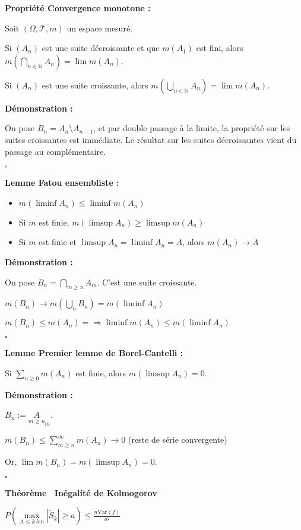 \documentclass[10pt,a4paper,notitlepage ]{report}
\newcommand{\N}{\mathbb N}
\newcommand{\T}{\mathcal T}
\newcommand{\1}{\mathds 1}
\newcommand{\var}{\mathrm{Var}}
\newcounter{th}
\newenvironment{theorem}[1][]{
\refstepcounter{th}
\begin{tcolorbox}
	\textbf{Théorème \theth \ #1}
	
	
}{\end{tcolorbox}}
\newenvironment{propriete}[1][]{
	\begin{tcolorbox}
		\textbf{Propriété #1 : }
}
{\end{tcolorbox}}
\newenvironment{demo}[1][]{

	\textbf{Démonstration #1 :}
}{\begin{flushright}
	$\square$
\end{flushright}
}
\newenvironment{lemme}[1][]{
	\begin{tcolorbox}
		\textbf{Lemme #1 : }
	}
	{\end{tcolorbox}}
\begin{document}
\begin{propriete}[Convergence monotone]
	Soit $(\Omega, \T, m)$ un espace mesuré.
	
	Si $(A_n)$ est une suite décroissante et que $m(A_1)$ est fini, alors $m(\underset {n\in\N} \bigcap A_n) = \lim m(A_n)$.
	
	Si $(A_n)$ est une suite croissante, alors $m(\underset {n\in\N} \bigcup A_n) = \lim m(A_n)$.
\end{propriete}

\begin{demo}
	On pose $B_n = A_n \setminus A_{n-1}$, et par double passage à la limite, la propriété sur les suites croissantes est immédiate. Le résultat sur les suites décroissantes vient du passage au complémentaire.
\end{demo}

\begin{lemme}[Fatou ensembliste]
	\begin{itemize}
		\item $m(\liminf A_n) \le \liminf m(A_n)$
		\item Si $m$ est finie, $m(\limsup A_n) \ge \limsup m(A_n)$
		\item Si $m$ est finie et $\limsup A_n = \liminf A_n = A$, alors $m(A_n) \rightarrow A$
	\end{itemize}
\end{lemme}

\begin{demo}
	On pose $B_n = \underset {m \ge n} \bigcap A_m$. C'est une suite croissante.
	
	$m(B_n) \rightarrow m(\underset n \bigcup B_n) = m(\liminf A_n)$
	
	$m(B_n) \le m(A_n)= \Rightarrow \liminf m(A_n) \le m(\liminf A_n)$
\end{demo}

\begin{lemme}[Premier lemme de Borel-Cantelli]
	Si $\underset {n\ge 0} \sum m(A_n)$ est finie, alors $m(\limsup A_n) = 0$.
\end{lemme}

\begin{demo}
	$B_n := \underset {m\ge n} A_m$.
	
	$m(B_n) \le \sum_{m \ge n}^\infty m(A_n) \rightarrow 0$ (reste de série convergente)
	
	Or, $\lim m(B_n) = m(\limsup A_n) = 0$.
\end{demo}

\begin{theorem}[Inégalité de Kolmogorov]
	$P( \underset {A \le k \ le n} \max |\tilde S_k| \ge a) \le \frac {n \var(f)} {a^2}$
\end{theorem}
\end{document}
